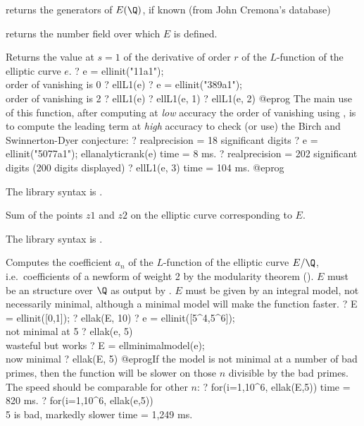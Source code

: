 \item {} returns the generators of $E(\Q)$, if known (from John
  Cremona's database)


\item {} returns the number field over which $E$ is defined.



\label{se:ellL1}
Returns the value at $s=1$ of the derivative of order $r$ of the
$L$-function of the elliptic curve $e$.
\bprog
? e = ellinit("11a1"); \\ order of vanishing is 0
? ellL1(e)
? e = ellinit("389a1");  \\ order of vanishing is 2
? ellL1(e)
? ellL1(e, 1)
? ellL1(e, 2)
@eprog\noindent
The main use of this function, after computing at \emph{low} accuracy the
order of vanishing using , is to compute the
leading term at \emph{high} accuracy to check (or use) the Birch and
Swinnerton-Dyer conjecture:
\bprog
? 
  realprecision = 18 significant digits
? e = ellinit("5077a1"); ellanalyticrank(e)
time = 8 ms.
? 
  realprecision = 202 significant digits (200 digits displayed)
? ellL1(e, 3)
time = 104 ms.
@eprog

The library syntax is .

\label{se:elladd}
Sum of the points $z1$ and $z2$ on the
elliptic curve corresponding to $E$.

The library syntax is .

\label{se:ellak}
Computes the coefficient $a_n$ of the $L$-function of the elliptic curve
$E/\Q$, i.e.~coefficients of a newform of weight 2 by the modularity theorem
(). $E$ must be an  structure
over $\Q$ as output by . $E$ must be given by an integral model,
not necessarily minimal, although a minimal model will make the function
faster.
\bprog
? E = ellinit([0,1]);
? ellak(E, 10)
? e = ellinit([5^4,5^6]); \\ not minimal at 5
? ellak(e, 5) \\ wasteful but works
? E = ellminimalmodel(e); \\ now minimal
? ellak(E, 5)
@eprog\noindent If the model is not minimal at a number of bad primes, then
the function will be slower on those $n$ divisible by the bad primes.
The speed should be comparable for other $n$:
\bprog
? for(i=1,10^6, ellak(E,5))
time = 820 ms.
? for(i=1,10^6, ellak(e,5)) \\ 5 is bad, markedly slower
time = 1,249 ms.

